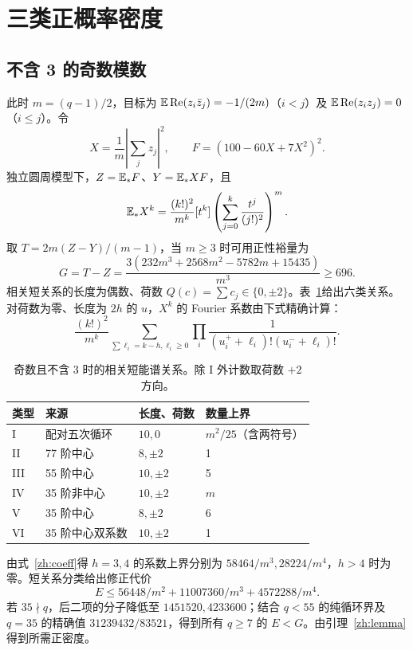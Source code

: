 \documentclass[UTF8,fontset=none,11pt]{ctexart}
\begin{document}
\section{三类正概率密度}
\subsection{不含 3 的奇数模数}
此时 $m=(q-1)/2$，目标为 $\mathbb E\operatorname{Re}(z_i\bar z_j)=-1/(2m)$（$i<j$）及 $\mathbb E\operatorname{Re}(z_i z_j)=0$（$i\le j$）。令
\begin{equation}X=\frac1m\left|\sum_j z_j\right|^2,\qquad F=(100-60X+7X^2)^2.\end{equation}
独立圆周模型下，$Z=\mathbb E_*F$、$Y=\mathbb E_*XF$，且
\[\mathbb E_*X^k=\frac{(k!)^2}{m^k}[t^k]\left(\sum_{j=0}^k\frac{t^j}{(j!)^2}\right)^m.\]
取 $T=2m(Z-Y)/(m-1)$，当 $m\ge3$ 时可用正性裕量为
\[G=T-Z=\frac{3(232m^3+2568m^2-5782m+15435)}{m^3}\ge696.\]
相关短关系的长度为偶数、荷数 $Q(c)=\sum c_j\in\{0,\pm2\}$。表~\ref{zh:odd}给出六类关系。对荷数为零、长度为 $2h$ 的 $u$，$X^k$ 的 Fourier 系数由下式精确计算：
\begin{equation}\label{zh:coeff}\frac{(k!)^2}{m^k}\sum_{\sum\ell_i=k-h,\ell_i\ge0}\prod_i\frac1{(u_i^++\ell_i)!(u_i^-+\ell_i)!}.\end{equation}
\begin{table}[ht]\centering\small\caption{奇数且不含 3 时的相关短能谱关系。除 I 外计数取荷数 $+2$ 方向。}\label{zh:odd}\begin{tabular}{llll}\toprule 类型 & 来源 & 长度、荷数 & 数量上界\\\midrule I & 配对五次循环 & $10,0$ & $m^2/25$（含两符号）\\II & 77 阶中心 & $8,\pm2$ & 1\\III & 55 阶中心 & $10,\pm2$ & 5\\IV & 35 阶非中心 & $10,\pm2$ & $m$\\V & 35 阶中心 & $8,\pm2$ & 6\\VI & 35 阶中心双系数 & $10,\pm2$ & 1\\\bottomrule\end{tabular}\end{table}
由式~\eqref{zh:coeff}得 $h=3,4$ 的系数上界分别为 $58464/m^3,28224/m^4$，$h>4$ 时为零。短关系分类给出修正代价
\[E\le56448/m^2+11007360/m^3+4572288/m^4.\]
若 $35\nmid q$，后二项的分子降低至 $1451520,4233600$；结合 $q<55$ 的纯循环界及 $q=35$ 的精确值 $31239432/83521$，得到所有 $q\ge7$ 的 $E<G$。由引理~\ref{zh:lemma}得到所需正密度。
\end{document}
